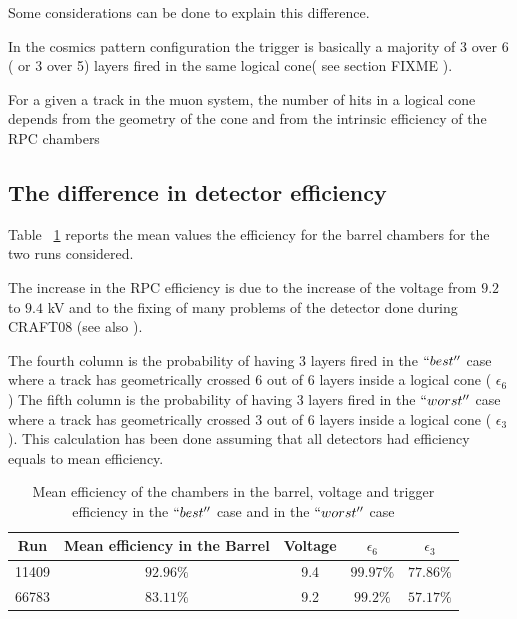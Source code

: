 
Some considerations can be done to explain this difference.

In the cosmics pattern configuration the trigger is basically
a majority of 3 over 6 ( or 3 over 5) layers fired in the
same logical cone( see section FIXME ).

For a given a track in the muon system,
the number of hits in a logical cone
depends from the geometry of the cone and 
from the intrinsic efficiency of the RPC chambers

\subsection{The difference in detector efficiency }

Table ~\ref{tab:meaneffs} reports the mean values the efficiency 
for the barrel chambers for the two runs considered.

The increase in the RPC efficiency is due to the increase of the 
voltage from $9.2$ to $9.4$ kV and to the fixing of many problems 
of the detector done during CRAFT08 (see also \cite{ref:craft08pap} ).

The fourth column is the probability of having 3 layers fired
in the $``best''$ case where a track has 
geometrically crossed 6 out of 6 layers inside a 
logical cone ( $\epsilon_{6}$)
The fifth column is the 
probability of having 3 layers fired
in the  $ ``worst''$ case where
a track has geometrically crossed 3 out of 6 layers inside a 
logical cone ( $\epsilon_{3}$ ).
This calculation has been done
assuming that all detectors had efficiency equals to mean efficiency.


\begin{table}[htb]
  \label{tab:meaneffs}
    \begin{center}
      \begin{tabular}{|c|c|c|c|c|} \hline
Run & Mean efficiency in the Barrel & Voltage & $\epsilon_{6}$ & $\epsilon_{3}$\\ \hline
11409 &	$92.96 \%$ & 9.4 & $99.97 \%$ & $77.86 \%$  \\ \hline
66783 & $83.11 \%$ & 9.2 & $99.2 \%$ & $57.17 \%$ \\ \hline
      \end{tabular}
         \caption{ Mean efficiency of the chambers in the barrel, voltage and trigger efficiency in the $``best''$ case and in the $``worst''$ case 
}
 \end{center}
\end{table} 

